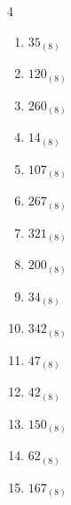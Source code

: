 \begin{multicols}{4}
\begin{enumerate}
  \item $35_{(8)}$

        \phantom{$=29$}

  \item $120_{(8)}$

        \phantom{$=80$}

  \item $260_{(8)}$

        \phantom{$=176$}

  \item $14_{(8)}$

        \phantom{$=12$}

  \item $107_{(8)}$

        \phantom{$=71$}

  \item $267_{(8)}$

        \phantom{$=183$}

  \item $321_{(8)}$

        \phantom{$=209$}

  \item $200_{(8)}$

        \phantom{$=128$}

  \item $34_{(8)}$

        \phantom{$=28$}

\columnbreak %

\resetques

  \item $342_{(8)}$

        \phantom{$=226$}

  \item $47_{(8)}$

        \phantom{$=39$}

  \item $42_{(8)}$

        \phantom{$=34$}

  \item $150_{(8)}$

        \phantom{$=104$}

  \item $62_{(8)}$

        \phantom{$=50$}

  \item $167_{(8)}$

        \phantom{$=119$}


\end{enumerate}
\end{multicols}
